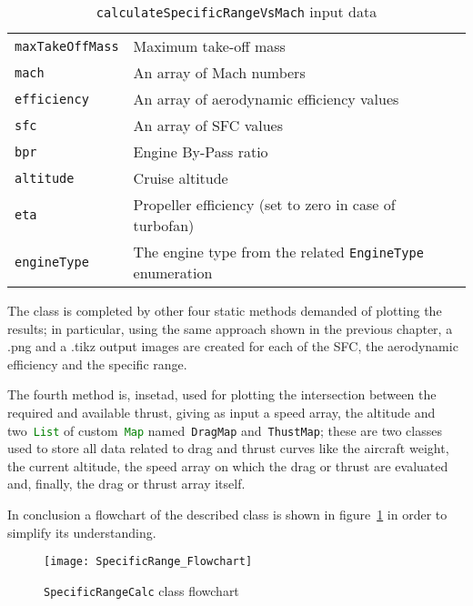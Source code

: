 \begin{table}[!b]
\begin{tabular}{p{7cm}p{7.5cm}}
\toprule
\lstinline[language=Java]!maxTakeOffMass! & Maximum take-off mass \\[0.1	cm]
\lstinline[language=Java]!mach!	& An array of Mach numbers \\[0.1cm]
\lstinline[language=Java]!efficiency!	& An array of aerodynamic efficiency values \\[0.1cm]
\lstinline[language=Java]!sfc!	& An array of SFC values \\[0.1cm]
\lstinline[language=Java]!bpr! & Engine By-Pass ratio \\[0.1cm]
\lstinline[language=Java]!altitude! & Cruise altitude \\[0.1cm]
\lstinline[language=Java]!eta!	& Propeller efficiency (set to zero in case of turbofan) \\[0.1cm]
\lstinline[language=Java]!engineType! & The engine type from the related \lstinline[language=Java]!EngineType! enumeration \\
\bottomrule
\end{tabular}
\caption{ \lstinline[language=Java]!calculateSpecificRangeVsMach! input data}
\label{table:Table3}
\end{table}

\bigskip
\noindent
The class is completed by other four static methods demanded of plotting the results; in particular, using the same approach shown in the previous chapter, a .png and a .tikz output images are created for each of the SFC, the aerodynamic efficiency and the specific range.

The fourth method is, insetad, used for plotting the intersection between the required and available thrust, giving as input a speed array, the altitude and two~\lstinline[language=Java]!List! of custom~\lstinline[language=Java]!Map! named~\lstinline[language=Java]!DragMap! and~\lstinline[language=Java]!ThustMap!; these are two classes used to store all data related to drag and thrust curves like the aircraft weight, the current altitude, the speed array on which the drag or thrust are evaluated and, finally, the drag or thrust array itself.  

\bigskip
\noindent
In conclusion a flowchart of the described class is shown in figure~\ref{fig:Figure7} in order to simplify its understanding.

\begin{figure}[t]
\centering
\texttt{[image: SpecificRange\_Flowchart]}
\caption{\lstinline[language=Java]!SpecificRangeCalc! class flowchart}
\label{fig:Figure7}
\end{figure}

